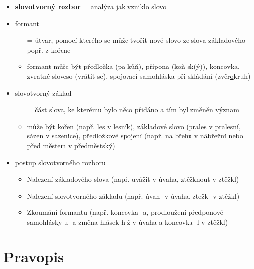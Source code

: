 \documentclass{memoir}
\begin{document}
\begin{itemize}
	\item \textbf{slovotvorný rozbor} = analýza jak vzniklo slovo
	\item formant
	\begin{itemize}
		\item[=] útvar, pomocí kterého se může tvořit nové slovo ze slova základového popř. z kořene
		\item formant může být předložka (pa-kůň), přípona (koň-sk(ý)), koncovka, zvratné sloveso (vrátit se), spojovací samohláska při skládání (zvěr\underline{o}kruh)
	\end{itemize}
	\item slovotvorný základ
	\begin{itemize}
		\item[=] část slova, ke kterému bylo něco přidáno a tím byl změněn význam
		\item může být kořen (např. les v lesník), základové slovo (prales v pralesní, sázen v sazenice), předložkové spojení (např. na břehu v nábřežní nebo před městem v předměstský)
	\end{itemize}
	\item postup slovotvorného rozboru
	\begin{itemize}
		\item Nalezení základového slova (např. uvážit v úvaha, ztěžknout v ztěžkl)
		\item Nalezení slovotvorného základu (např. úvah- v úvaha, ztežk- v ztěžkl)
		\item Zkoumání formantu (např. koncovka -a, prodloužení předponové samohlásky u- a změna hlásek h-ž v úvaha a koncovka -l v ztěžkl)
	\end{itemize}
\end{itemize}

\section*{Pravopis}
\end{document}
